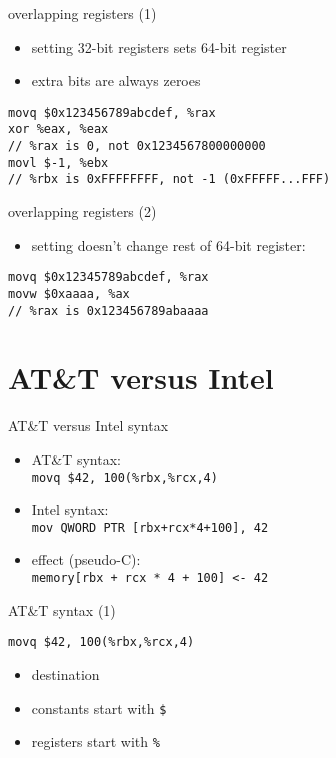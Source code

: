 \begin{frame}[fragile,label=overlap]{overlapping registers (1)}
\begin{itemize}
\item setting 32-bit registers sets  64-bit register
\item extra bits are always zeroes
\end{itemize}
\begin{lstlisting}[style=small]
movq $0x123456789abcdef, %rax
xor %eax, %eax
// %rax is 0, not 0x1234567800000000
movl $-1, %ebx
// %rbx is 0xFFFFFFFF, not -1 (0xFFFFF...FFF)
\end{lstlisting}
\end{frame}

\begin{frame}[fragile,label=overlap2]{overlapping registers (2)}
\begin{itemize}
\item setting  doesn't change rest of 64-bit register:
\end{itemize}
\begin{lstlisting}[style=small]
movq $0x12345789abcdef, %rax
movw $0xaaaa, %ax
// %rax is 0x123456789abaaaa
\end{lstlisting}
\end{frame}


\section{AT\&T versus Intel}

\begin{frame}{AT\&T versus Intel syntax}
    \begin{itemize}
    \item AT\&T syntax: \\ {\tt movq \$42, 100(\%rbx,\%rcx,4)}
    \item Intel syntax: \\ {\tt mov QWORD PTR [rbx+rcx*4+100], 42}
    \item effect (pseudo-C): \\ {\tt memory[rbx + rcx * 4 + 100] <- 42}
    \end{itemize}
\end{frame}

\begin{frame}[fragile,label=att1]{AT\&T syntax (1)}
\begin{lstlisting}
movq $42, 100(%rbx,%rcx,4)
\end{lstlisting}
    \begin{itemize}
    \item destination 
    \item constants start with {\tt \$}
    \item registers start with {\tt \%}
    \end{itemize}
\end{frame}

